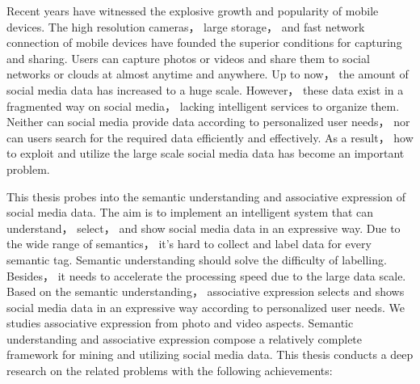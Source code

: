 \begin{enabstract}
    Recent years have witnessed the explosive growth and popularity of mobile
    devices. The high resolution cameras， large storage， and fast
    network connection of mobile devices have founded the superior
    conditions for capturing and sharing. Users can capture photos or videos
    and share them to social networks or clouds at almost anytime and anywhere.
    Up to now， the amount of social media data has increased to a huge scale.
    However， these data exist in a fragmented way on social media， lacking intelligent
    services to organize them. Neither can social media provide data according
    to personalized user needs， nor can users search for the required data efficiently
    and effectively. As a result， how to exploit and utilize the
    large scale social media data has become an important problem.

    This thesis probes into the semantic understanding and associative
    expression of social media data. The aim is to implement an intelligent
    system that can understand， select， and show social media data
    in an expressive way. Due to the wide range of semantics， it's hard to
    collect and label data for every semantic tag. Semantic understanding
    should solve the difficulty of labelling. Besides， it needs to accelerate
    the processing speed due to the large data scale. Based on the semantic understanding，
    associative expression selects and shows social media data in an expressive
    way according to personalized user needs. We studies associative
    expression from photo and video aspects. Semantic understanding and
    associative expression compose a relatively complete framework for mining
    and utilizing social media data. This thesis conducts a deep research
    on the related problems with the following achievements:



\end{enabstract}
